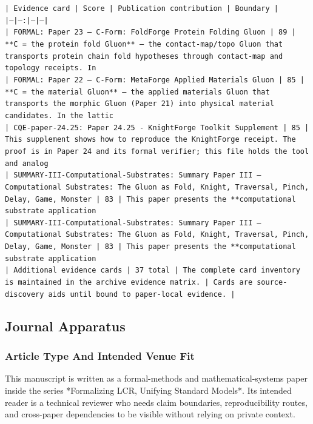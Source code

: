 \documentclass[11pt]{article}
\begin{document}
\noindent\texttt{| Evidence card | Score | Publication contribution | Boundary |}\\
\noindent\texttt{|---|---:|---|---|}\\
\noindent\texttt{| FORMAL: Paper 23 — C-Form: FoldForge Protein Folding Gluon | 89 | **C = the protein fold Gluon** — the contact-map/topo Gluon that transports protein chain fold hypotheses through contact-map and topology receipts. In }\\
\noindent\texttt{| FORMAL: Paper 22 — C-Form: MetaForge Applied Materials Gluon | 85 | **C = the material Gluon** — the applied materials Gluon that transports the morphic Gluon (Paper 21) into physical material candidates. In the lattic}\\
\noindent\texttt{| CQE-paper-24.25: Paper 24.25 - KnightForge Toolkit Supplement | 85 | This supplement shows how to reproduce the KnightForge receipt. The proof is in Paper 24 and its formal verifier; this file holds the tool and analog}\\
\noindent\texttt{| SUMMARY-III-Computational-Substrates: Summary Paper III — Computational Substrates: The Gluon as Fold, Knight, Traversal, Pinch, Delay, Game, Monster | 83 | This paper presents the **computational substrate application}\\
\noindent\texttt{| SUMMARY-III-Computational-Substrates: Summary Paper III — Computational Substrates: The Gluon as Fold, Knight, Traversal, Pinch, Delay, Game, Monster | 83 | This paper presents the **computational substrate application}\\
\noindent\texttt{| Additional evidence cards | 37 total | The complete card inventory is maintained in the archive evidence matrix. | Cards are source-discovery aids until bound to paper-local evidence. |}\\

\subsection*{Journal Apparatus}

\subsubsection*{Article Type And Intended Venue Fit}

This manuscript is written as a formal-methods and mathematical-systems paper
inside the series *Formalizing LCR, Unifying Standard Models*. Its intended
reader is a technical reviewer who needs claim boundaries, reproducibility
routes, and cross-paper dependencies to be visible without relying on private
context.
\end{document}
